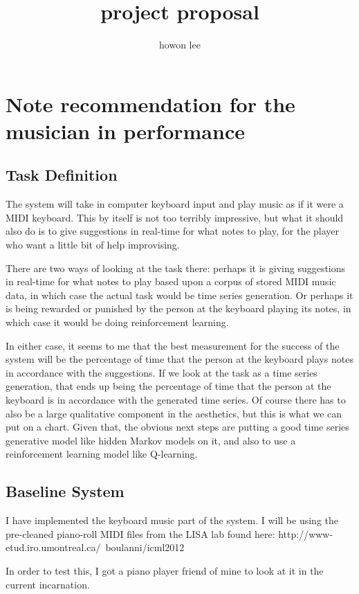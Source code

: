 \documentclass{article}
\begin{document}
\title{project proposal}
\author{howon lee}
\maketitle
\section*{Note recommendation for the musician in performance}
\subsection*{Task Definition}
The system will take in computer keyboard input and play music as if it were a MIDI keyboard. This by itself is not too terribly impressive, but what it should also do is to give suggestions in real-time for what notes to play, for the player who want a little bit of help improvising.

There are two ways of looking at the task there: perhaps it is giving suggestions in real-time for what notes to play based upon a corpus of stored MIDI music data, in which case the actual task would be time series generation. Or perhaps it is being rewarded or punished by the person at the keyboard playing its notes, in which case it would be doing reinforcement learning.

In either case, it seems to me that the best measurement for the success of the system will be the percentage of time that the person at the keyboard plays notes in accordance with the suggestions. If we look at the task as a time series generation, that ends up being the percentage of time that the person at the keyboard is in accordance with the generated time series. Of course there has to also be a large qualitative component in the aesthetics, but this is what we can put on a chart. Given that, the obvious next steps are putting a good time series generative model like hidden Markov models on it, and also to use a reinforcement learning model like Q-learning.
\subsection*{Baseline System}
I have implemented the keyboard music part of the system. I will be using the pre-cleaned piano-roll MIDI files from the LISA lab found here:
http://www-etud.iro.umontreal.ca/~boulanni/icml2012

In order to test this, I got a piano player friend of mine to look at it in the current incarnation.
\end{document}
